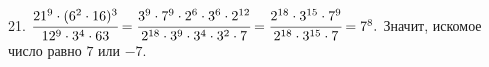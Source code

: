 21. $\cfrac{21^9\cdot(6^2\cdot16)^3}{12^9\cdot3^4\cdot63}=\cfrac{3^9\cdot7^9\cdot2^6\cdot3^6\cdot2^{12}}{2^{18}\cdot3^9\cdot3^4\cdot3^2\cdot7}=
\cfrac{2^{18}\cdot3^{15}\cdot7^9}{2^{18}\cdot3^{15}\cdot7}=7^8.$ Значит, искомое число равно $7$ или $-7.$\\
